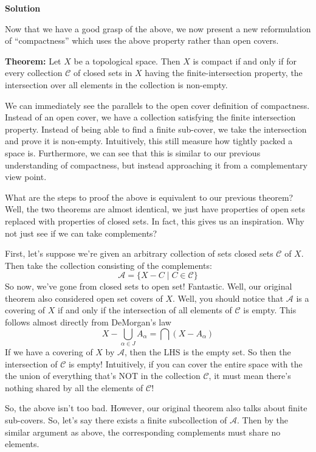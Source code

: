 \documentclass[12pt]{article}
\newcounter{AnswerCounter}
\newcounter{SubAnswerCounter}
\newenvironment{answer}[0]{
  \setcounter{SubAnswerCounter}{1}
  \bigskip
  \textbf{Solution \arabic{AnswerCounter}}
  \\
  \begin{small}
}{
  \end{small}
  \stepcounter{AnswerCounter}
}
\begin{document}
\begin{answer}[Problem 1]
Now that we have a good grasp of the above, we now present a new reformulation of ``compactness'' which uses the above property rather than open covers.

\textbf{Theorem:} Let $X$ be a topological space. Then $X$ is compact if and only if for every collection $\mathcal{C}$ of closed sets in $X$ having the finite-intersection property, the intersection over all elements in the collection is non-empty.

We can immediately see the parallels to the open cover definition of compactness. Instead of an open cover, we have a collection satisfying the finite intersection property. Instead of being able to find a finite sub-cover, we take the intersection and prove it is non-empty. Intuitively, this still measure how tightly packed a space is. Furthermore, we can see that this is similar to our previous understanding of compactness, but instead approaching it from a complementary view point.

What are the steps to proof the above is equivalent to our previous theorem? Well, the two theorems are almost identical, we just have properties of open sets replaced with properties of closed sets. In fact, this gives us an inspiration. Why not just see if we can take complements?

First, let's suppose we're given an arbitrary collection of sets closed sets $\mathcal{C}$ of $X$. Then take the collection consisting of the complements:
$$
\mathcal{A} = \{ X - C \mid C \in \mathcal{C}\}
$$
So now, we've gone from closed sets to open set! Fantastic. Well, our original theorem also considered open set covers of $X$. Well, you should notice that $\mathcal{A}$ is a covering of $X$ if and only if the intersection of all elements of $\mathcal{C}$ is empty. This follows almost directly from DeMorgan's law
$$
X - \bigcup_{\alpha \in J} A_{\alpha} = \bigcap (X - A_{\alpha})
$$
If we have a covering of $X$ by $\mathcal{A}$, then the LHS is the empty set. So then the intersection of $\mathcal{C}$ is empty! Intuitively, if you can cover the entire space with the the union of everything that's NOT in the collection $\mathcal{C}$, it must mean there's nothing shared by all the elements of $\mathcal{C}$!

So, the above isn't too bad. However, our original theorem also talks about finite sub-covers. So, let's say there exists a finite subcollection of $\mathcal{A}$. Then by the similar argument as above, the corresponding complements must share no elements.


\end{answer}
\end{document}
